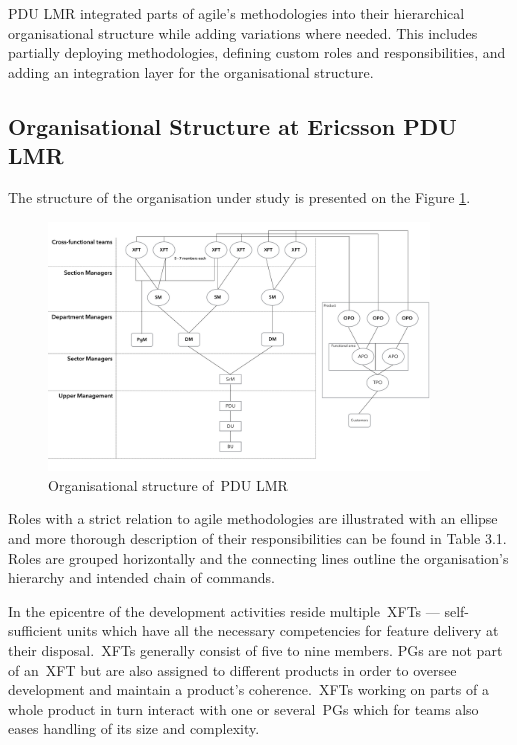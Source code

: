 PDU LMR integrated parts of agile's methodologies into their hierarchical organisational structure while adding variations where needed. This includes partially deploying methodologies, defining custom roles and responsibilities, and adding an integration layer for the organisational structure.

\subsection{Organisational Structure at Ericsson PDU LMR}
\label{Chap:OrgStrucEricsson}

The structure of the organisation under study is presented on the Figure \ref{fig:org-structure}.

\begin{figure}[h!]
  \centering
  \includegraphics[width=0.90\textwidth]{figures/organisational-structure.pdf}
  \caption{Organisational structure of~\ac{PDU LMR}}
  \label{fig:org-structure}
\end{figure}

Roles with a strict relation to agile methodologies are illustrated with an ellipse and more thorough description of their responsibilities can be found in Table 3.1. Roles are grouped horizontally and the connecting lines outline the organisation's hierarchy and intended chain of commands.

In the epicentre of the development activities reside multiple~\acp{XFT} — self-sufficient units which have all the necessary competencies for feature delivery at their disposal.~\acp{XFT} generally consist of five to nine members. 
\acp{PG} are not part of an~\ac{XFT} but are also assigned to different products in order to oversee development and maintain a product's coherence.~\acp{XFT} working on parts of a whole product in turn interact with one or several~\acp{PG} which for teams also eases handling of its size and complexity.


